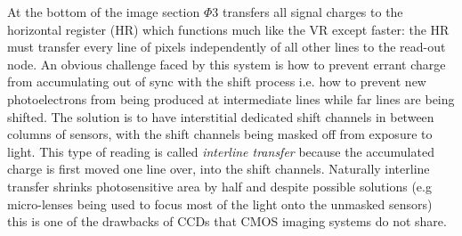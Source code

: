 At the bottom of the image section $\Phi3$ transfers all signal charges to the horizontal register (HR) which functions much like the VR except faster: the HR must transfer every line of pixels independently of all other lines to the read-out node.
%
An obvious challenge faced by this system is how to prevent errant charge from accumulating out of sync with the shift process i.e. how to prevent new photoelectrons from being produced at intermediate lines while far lines are being shifted.
%
The solution is to have interstitial dedicated shift channels in between columns of sensors, with the shift channels being masked off from exposure to light.
%
This type of reading is called \textit{interline transfer} because the accumulated charge is first moved one line over, into the shift channels.
%
Naturally interline transfer shrinks photosensitive area by half and despite possible solutions (e.g micro-lenses being used to focus most of the light onto the unmasked sensors) this is one of the drawbacks of CCDs that CMOS imaging systems do not share.

